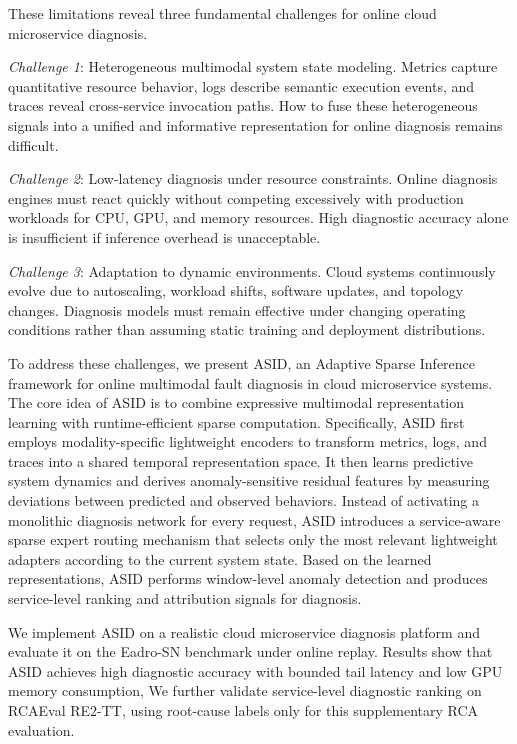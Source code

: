 These limitations reveal three fundamental challenges for online cloud microservice diagnosis.

\textit{Challenge 1}: Heterogeneous multimodal system state modeling.
Metrics capture quantitative resource behavior, logs describe semantic execution events, and traces reveal cross-service invocation paths. How to fuse these heterogeneous signals into a unified and informative representation for online diagnosis remains difficult.

\textit{Challenge 2}: Low-latency diagnosis under resource constraints.
Online diagnosis engines must react quickly without competing excessively with production workloads for CPU, GPU, and memory resources. High diagnostic accuracy alone is insufficient if inference overhead is unacceptable.

\textit{Challenge 3}: Adaptation to dynamic environments.
Cloud systems continuously evolve due to autoscaling, workload shifts, software updates, and topology changes. Diagnosis models must remain effective under changing operating conditions rather than assuming static training and deployment distributions.

To address these challenges, we present ASID, an Adaptive Sparse Inference framework for online multimodal fault diagnosis in cloud microservice systems. The core idea of ASID is to combine expressive multimodal representation learning with runtime-efficient sparse computation. Specifically, ASID first employs modality-specific lightweight encoders to transform metrics, logs, and traces into a shared temporal representation space. It then learns predictive system dynamics and derives anomaly-sensitive residual features by measuring deviations between predicted and observed behaviors. Instead of activating a monolithic diagnosis network for every request, ASID introduces a service-aware sparse expert routing mechanism that selects only the most relevant lightweight adapters according to the current system state.  Based on the learned representations, ASID performs window-level anomaly detection and produces service-level ranking and attribution signals for diagnosis.

We implement ASID on a realistic cloud microservice diagnosis platform and evaluate it on the Eadro-SN benchmark under online replay. Results show that ASID achieves high diagnostic accuracy with bounded tail latency and low GPU memory consumption,  We further validate service-level diagnostic ranking on RCAEval RE2-TT, using root-cause labels only for this supplementary RCA evaluation.

